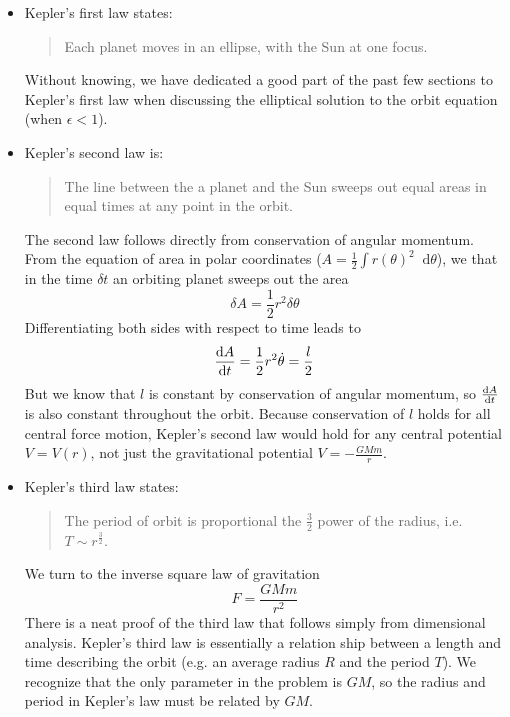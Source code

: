 \documentclass[11pt, a4paper]{article}
\newcommand{\diff}{\mathop{}\!\mathrm{d}} %
\begin{document}
\begin{itemize}
	\item Kepler's first law states:
	\begin{quote}
		Each planet moves in an ellipse, with the Sun at one focus.
	\end{quote}
	Without knowing, we have dedicated a good part of the past few sections to Kepler's first law when discussing the elliptical solution to the orbit equation (when $ \epsilon < 1 $). 
	
	\item Kepler's second law is:
	\begin{quote}
		The line between the a planet and the Sun sweeps out equal areas in equal times at any point in the orbit.
	\end{quote}
	The second law follows directly from conservation of angular momentum. From the equation of area in polar coordinates ($ A = \frac{1}{2}\int r(\theta)^{2}\diff \theta $), we that in the time $ \delta t $ an orbiting planet sweeps out the area
	\begin{equation*}
		\delta A = \frac{1}{2}r^{2} \delta \theta
	\end{equation*}
	Differentiating both sides with respect to time leads to
	\begin{equation*}
		\dv{A}{t} = \frac{1}{2} r^{2} \dot{\theta} = \frac{l}{2}
	\end{equation*}
	But we know that $ l $ is constant by conservation of angular momentum, so $ \dv{A}{t} $ is also constant throughout the orbit. Because conservation of $ l $ holds for all central force motion, Kepler's second law would hold for any central potential $ V = V(r) $, not just the gravitational potential $ V = -\frac{GMm}{r} $.
	
	\item Kepler's third law states:
	\begin{quote}
		The period of orbit is proportional the $ \frac{3}{2} $ power of the radius, i.e. $ T \sim r^{\frac{3}{2}} $.
	\end{quote}
	We turn to the inverse square law of gravitation 
	\begin{equation*}
		F = \frac{GMm}{r^{2}}
	\end{equation*}
	There is a neat proof of the third law that follows simply from dimensional analysis. Kepler's third law is essentially a relation ship between a length and time describing the orbit (e.g. an average radius $ R $ and the period $ T $). We recognize that the only parameter in the problem is $ GM $, so the radius and period in Kepler's law must be related by $ GM $. 
	

\end{itemize}
\end{document}
